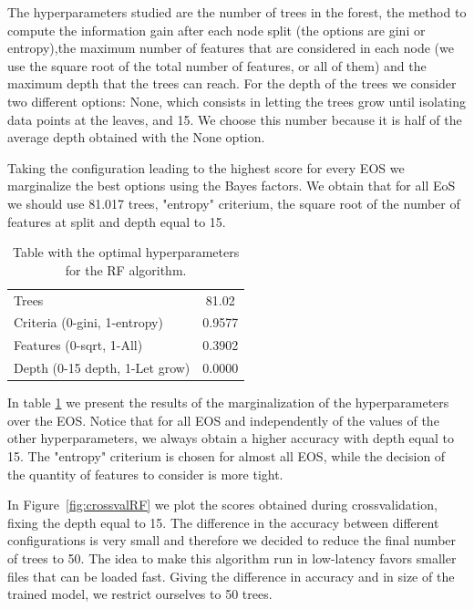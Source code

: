 The hyperparameters studied are the number of trees in the forest, the method to compute the information gain after each node split (the options are gini or entropy),the maximum number of features that are considered in each node (we use the square root of the total number of features, or all of them) and the maximum depth that the trees can reach. For the depth of the trees we consider two different options: None, which consists in letting the trees grow until isolating data points at the leaves, and 15. We choose this number because it is half of the average depth obtained with the None option.

Taking the configuration leading to the highest score for every EOS we marginalize the best options using the Bayes factors. We obtain that for all EoS we should use 81.017 trees, "entropy" criterium, the square root of the number of features at split and depth equal to 15.

\begin{table}[h]
\begin{tabular}{|l|c|}
\hline
Trees& 81.02 \\
Criteria (0-gini, 1-entropy)& 0.9577 \\
Features (0-sqrt, 1-All)& 0.3902  \\
Depth (0-15 depth, 1-Let grow)& 0.0000 \\ \hline
\end{tabular}
\caption{Table with the optimal hyperparameters for the RF algorithm. \label{tab:RF_cross_params}}
\end{table}

In table \ref{tab:RF_cross_params} we present the results of the marginalization of the hyperparameters over the EOS. Notice that for all EOS and independently of the values of the other hyperparameters, we always obtain a higher accuracy with depth equal to 15. The "entropy" criterium is chosen for almost all EOS, while the decision of the quantity of features to consider is more tight.

In Figure~\ref{fig:crossvalRF} we plot the scores obtained during crossvalidation, fixing the depth equal to 15. The difference in the accuracy between different configurations is very small and therefore we decided to reduce the final number of trees to 50. The idea to make this algorithm run in low-latency favors smaller files that can be loaded fast. Giving the difference in accuracy and in size of the trained model, we restrict ourselves to 50 trees.

